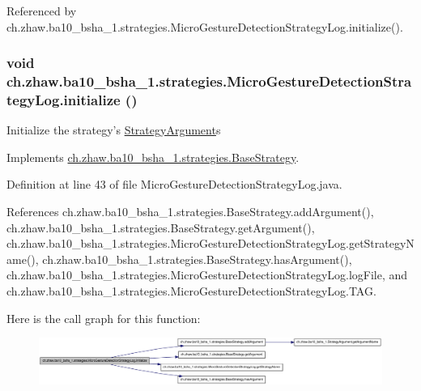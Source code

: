 Referenced by ch.zhaw.ba10\_\-bsha\_\-1.strategies.MicroGestureDetectionStrategyLog.initialize().\hypertarget{classch_1_1zhaw_1_1ba10__bsha__1_1_1strategies_1_1MicroGestureDetectionStrategyLog_a01832dff2f81e3c73212c6d7c3561e5b}{
\subsubsection[{initialize}]{\setlength{\rightskip}{0pt plus 5cm}void ch.zhaw.ba10\_\-bsha\_\-1.strategies.MicroGestureDetectionStrategyLog.initialize ()}}
\label{classch_1_1zhaw_1_1ba10__bsha__1_1_1strategies_1_1MicroGestureDetectionStrategyLog_a01832dff2f81e3c73212c6d7c3561e5b}
Initialize the strategy's \hyperlink{classch_1_1zhaw_1_1ba10__bsha__1_1_1StrategyArgument}{StrategyArgument}s 

Implements \hyperlink{classch_1_1zhaw_1_1ba10__bsha__1_1_1strategies_1_1BaseStrategy_af6ea27835befac71906915236a347450}{ch.zhaw.ba10\_\-bsha\_\-1.strategies.BaseStrategy}.

Definition at line 43 of file MicroGestureDetectionStrategyLog.java.

References ch.zhaw.ba10\_\-bsha\_\-1.strategies.BaseStrategy.addArgument(), ch.zhaw.ba10\_\-bsha\_\-1.strategies.BaseStrategy.getArgument(), ch.zhaw.ba10\_\-bsha\_\-1.strategies.MicroGestureDetectionStrategyLog.getStrategyName(), ch.zhaw.ba10\_\-bsha\_\-1.strategies.BaseStrategy.hasArgument(), ch.zhaw.ba10\_\-bsha\_\-1.strategies.MicroGestureDetectionStrategyLog.logFile, and ch.zhaw.ba10\_\-bsha\_\-1.strategies.MicroGestureDetectionStrategyLog.TAG.

Here is the call graph for this function:\nopagebreak
\begin{figure}[H]
\begin{center}
\leavevmode
\includegraphics[width=420pt]{classch_1_1zhaw_1_1ba10__bsha__1_1_1strategies_1_1MicroGestureDetectionStrategyLog_a01832dff2f81e3c73212c6d7c3561e5b_cgraph}
\end{center}
\end{figure}


